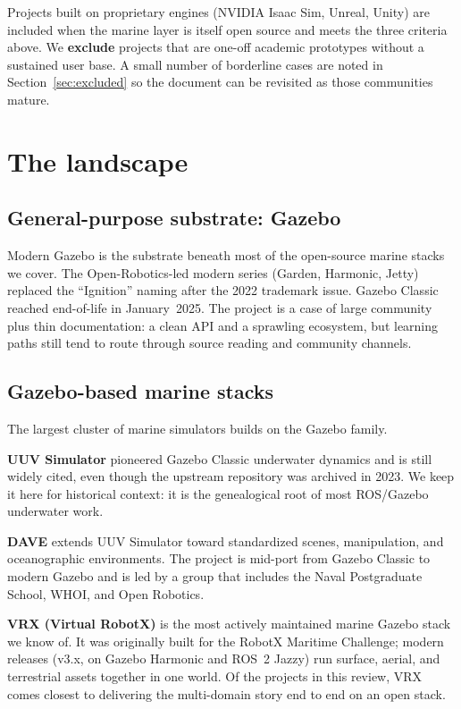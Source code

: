 \documentclass[11pt]{article}
\begin{document}
Projects built on proprietary engines (NVIDIA Isaac Sim, Unreal, Unity) are included when the marine layer is itself open source and meets the three criteria above. We \textbf{exclude} projects that are one-off academic prototypes without a sustained user base. A small number of borderline cases are noted in Section~\ref{sec:excluded} so the document can be revisited as those communities mature.

\section{The landscape}
\label{sec:landscape}

\subsection{General-purpose substrate: Gazebo}
Modern Gazebo \autocite{koenig2004gazebo} is the substrate beneath most of the open-source marine stacks we cover. The Open-Robotics-led modern series (Garden, Harmonic, Jetty) replaced the ``Ignition'' naming after the 2022 trademark issue. Gazebo Classic reached end-of-life in January~2025. The project is a case of large community plus thin documentation: a clean API and a sprawling ecosystem, but learning paths still tend to route through source reading and community channels.

\subsection{Gazebo-based marine stacks}
\label{sec:gazebo-marine}

The largest cluster of marine simulators builds on the Gazebo family.

\textbf{UUV Simulator} \autocite{manhaes2016uuvsim} pioneered Gazebo Classic underwater dynamics and is still widely cited, even though the upstream repository was archived in 2023. We keep it here for historical context: it is the genealogical root of most ROS/Gazebo underwater work.

\textbf{DAVE} \autocite{zhang2022dave} extends UUV Simulator toward standardized scenes, manipulation, and oceanographic environments. The project is mid-port from Gazebo Classic to modern Gazebo and is led by a group that includes the Naval Postgraduate School, WHOI, and Open Robotics.

\textbf{VRX (Virtual RobotX)} \autocite{bingham2021vrx} is the most actively maintained marine Gazebo stack we know of. It was originally built for the RobotX Maritime Challenge; modern releases (v3.x, on Gazebo Harmonic and ROS~2 Jazzy) run surface, aerial, and terrestrial assets together in one world. Of the projects in this review, VRX comes closest to delivering the multi-domain story end to end on an open stack.
\end{document}
